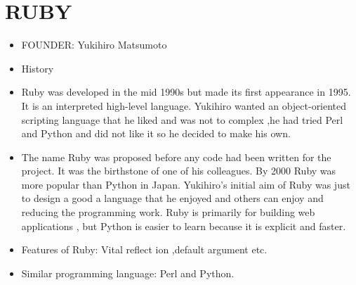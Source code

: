 \documentclass{article}
\begin{document}
	\section{RUBY}
	\begin{itemize}
		\item FOUNDER: Yukihiro Matsumoto
		\item History
		\item Ruby was developed in the mid 1990s but made its first appearance in 1995. It is an interpreted high-level language. Yukihiro wanted an object-oriented scripting language that he liked and was not to complex ,he had tried Perl and Python and did not like it so he decided to make his own.
		\item The name Ruby was proposed before any code had been written for the project. It was the birthstone of one of his colleagues. By 2000 Ruby was more popular than Python in Japan. Yukihiro’s initial aim of Ruby was just to design a good a language that he enjoyed and others can enjoy and reducing the programming work. Ruby is primarily for building web applications , but Python is easier to learn because it is explicit and faster.
		
		\item Features of Ruby:
		Vital reflect ion ,default argument etc.
		
		\item Similar programming language: Perl and Python.
		
		
		
		
	\end{itemize}
\end{document}
